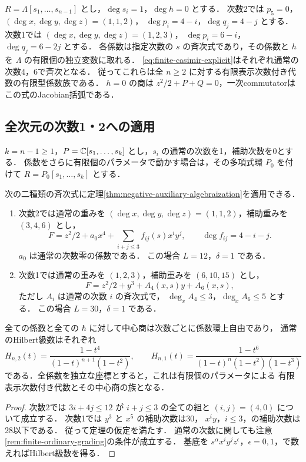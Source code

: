 \begin{remark}[通常の射影的次数]
\label{rem:explicit-finite-internal-grading}
$R=\Lambda[s_1,\ldots,s_{n-1}]$ とし，$\deg s_i=1$，$\deg h=0$ とする．
次数2では $p_5=0$，$(\deg x,\deg y,\deg z)=(1,1,2)$，
$\deg p_i=4-i$，$\deg q_j=4-j$ とする．
次数1では $(\deg x,\deg y,\deg z)=(1,2,3)$，
$\deg p_i=6-i$，$\deg q_j=6-2j$ とする．
各係数は指定次数の $s$ の斉次式であり，その係数と $h$ を
$\Lambda$ の有限個の独立変数に取れる．
\eqref{eq:finite-casimir-explicit}はそれぞれ通常の次数4，6で斉次となる．
従ってこれらは全 $n\ge2$ に対する有限表示次数付き代数の有限型係数族である．
$h=0$ の商は $z^2/2+P+Q=0$，一次commutatorはこの式のJacobian括弧である．
\end{remark}

\subsection{全次元の次数1・2への適用}

$k=n-1\ge1$，$P=\mathbb C[s_1,\ldots,s_k]$ とし，$s_i$ の通常の次数を1，補助次数を0とする．
係数をさらに有限個のパラメータで動かす場合は，その多項式環 $P_0$ を付けて
$R=P_0[s_1,\ldots,s_k]$ とする．

\begin{corollary}[両次数の有限型係数族]
\label{cor:finite-dp-coefficient-families}
次の二種類の斉次式に定理\ref{thm:negative-auxiliary-algebraization}を適用できる．
\begin{enumerate}
\item 次数2では通常の重みを
$(\deg x,\deg y,\deg z)=(1,1,2)$，補助重みを $(3,4,6)$ とし，
\[
 F=z^2/2+a_0x^4+\sum_{i+j\le3}f_{ij}(s)x^iy^j,
 \qquad \deg f_{ij}=4-i-j.
\]
$a_0$ は通常の次数零の係数である．
この場合 $L=12$，$\delta=1$ である．
\item 次数1では通常の重みを $(1,2,3)$，補助重みを $(6,10,15)$ とし，
\[
 F=z^2/2+y^3+A_4(x,s)y+A_6(x,s),
\]
ただし $A_i$ は通常の次数 $i$ の斉次式で，
$\deg_xA_4\le3$，$\deg_xA_6\le5$ とする．
この場合 $L=30$，$\delta=1$ である．
\end{enumerate}
全ての係数と全ての $\hbar$ に対して中心商は次数ごとに係数環上自由であり，
通常のHilbert級数はそれぞれ
\[
 H_{n,2}(t)=\frac{1-t^4}{(1-t)^{n+1}(1-t^2)},
 \qquad
 H_{n,1}(t)=\frac{1-t^6}{(1-t)^n(1-t^2)(1-t^3)}
\]
である．全係数を独立な座標とすると，これは有限個のパラメータによる
有限表示次数付き代数とその中心商の族となる．
\end{corollary}

\begin{proof}
次数2では $3i+4j\le12$ が $i+j\le3$ の全ての組と $(i,j)=(4,0)$ について成立する．
次数1では $y^3$ と $x^5$ の補助次数は30，
$x^iy$，$i\le3$，の補助次数は28以下である．
従って定理の仮定を満たす．
通常の次数に関しても注意\ref{rem:finite-ordinary-grading}の条件が成立する．
基底を $s^\alpha x^iy^jz^\epsilon$，$\epsilon=0,1$，で数えればHilbert級数を得る．
\end{proof}

